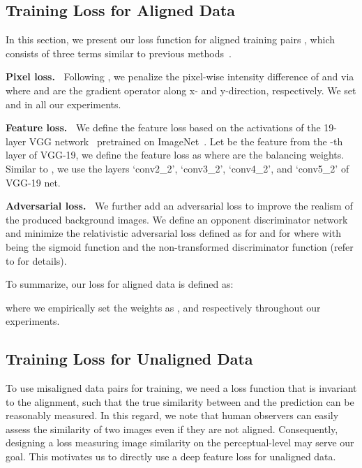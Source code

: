 \documentclass[10pt,twocolumn,letterpaper]{article}
\begin{document}
\subsection{Training Loss for Aligned Data}




In this section, we present our loss function for aligned training pairs , which consists of three terms similar to previous methods~\cite{zhang2018single,eccv18refrmv}.

\vspace{5pt}
\noindent\textbf{Pixel loss.~}
Following \cite{fan2017generic}, we penalize the pixel-wise intensity difference of  and  via 
where  and  are the gradient operator along x- and y-direction, respectively. We set  and  in all our experiments.

\vspace{5pt}
\noindent\textbf{Feature loss.~} 
We define the feature loss based on the activations of the 19-layer VGG network~\cite{simonyan2014very} pretrained on ImageNet~\cite{russakovsky2015imagenet}. Let  be the feature from the -th layer of VGG-19, we define the feature loss as 
where  are the balancing weights. Similar to \cite{zhang2018single}, we use the layers `conv2\_2', `conv3\_2', `conv4\_2', and  `conv5\_2' of VGG-19 net.



\vspace{6pt}
\noindent\textbf{Adversarial loss.~}
We further add an adversarial loss to improve the realism of the produced background images. We define an opponent discriminator network  and minimize the relativistic adversarial loss \cite{jolicoeurmartineau2018the} defined as  for  and  for  where  with   being the sigmoid function and  the non-transformed discriminator function (refer to \cite{jolicoeurmartineau2018the} for details). 





To summarize, our loss for aligned data is defined as:
 
where we empirically set the weights as , and  respectively throughout our experiments.
\subsection{Training Loss for Unaligned Data}


To use misaligned data pairs  for training, we need a loss function that is invariant to the alignment, such that the true similarity between  and the prediction  can be reasonably measured. In this regard, we note that human observers can easily assess the similarity of two images even if they are not aligned. Consequently, designing a loss measuring image similarity on the perceptual-level may serve our goal. This motivates us to directly use a deep feature loss for unaligned data. 
\end{document}

